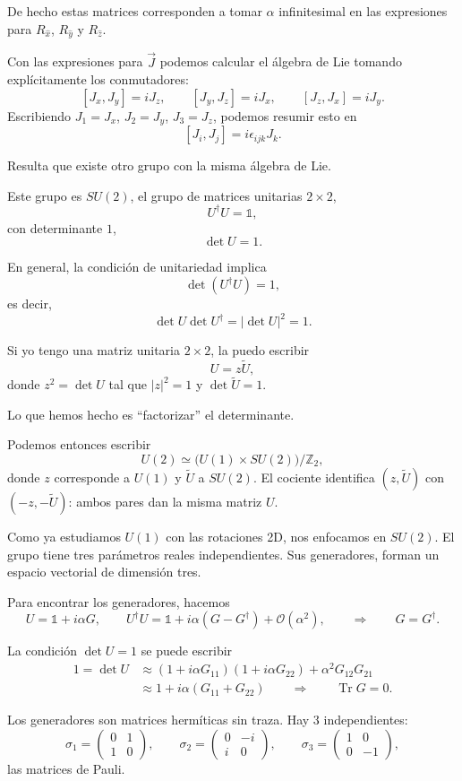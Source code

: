 \documentclass[11pt,a4paper]{article}
\newcommand{\concept}[1]{\textcolor{concept-green}{#1}}
\newcommand{\Tr}{\operatorname{Tr}}
\begin{document}
De hecho estas matrices corresponden a tomar $\alpha$ infinitesimal en las expresiones para $R_{\hat x}$, $R_{\hat y}$ y $R_{\hat z}$.

Con las expresiones para $\vec J$ podemos calcular el álgebra de Lie tomando explícitamente los conmutadores:
\[
  [J_x,J_y]=iJ_z,
  \qquad
  [J_y,J_z]=iJ_x,
  \qquad
  [J_z,J_x]=iJ_y.
\]
Escribiendo $J_1=J_x$, $J_2=J_y$, $J_3=J_z$, podemos resumir esto en
\[
  [J_i,J_j]=i\epsilon_{ijk}J_k.
\]

Resulta que existe otro grupo con la misma álgebra de Lie.

Este grupo es $SU(2)$, el grupo de matrices unitarias $2\times2$,
\[
  U^\dagger U=\mathbb 1,
\]
con determinante $1$,
\[
  \det U=1.
\]

En general, la condición de unitariedad implica
\[
  \det(U^\dagger U)=1,
\]
es decir,
\[
  \det U\det U^\dagger=|\det U|^2=1.
\]

Si yo tengo una matriz unitaria $2\times2$, la puedo escribir
\[
  U=z\widetilde U,
\]
donde $z^2=\det U$ tal que $|z|^2=1$ y $\det\widetilde U=1$.

Lo que hemos hecho es ``factorizar'' el determinante.

Podemos entonces escribir
\[
  U(2)\simeq\bigl(U(1)\times SU(2)\bigr)/\mathbb Z_2,
\]
donde $z$ corresponde a $U(1)$ y $\widetilde U$ a $SU(2)$.
El cociente identifica $(z,\widetilde U)$ con $(-z,-\widetilde U)$:
ambos pares dan la misma matriz $U$.

Como ya estudiamos $U(1)$ con las rotaciones 2D, nos enfocamos en $SU(2)$. El grupo tiene tres parámetros reales independientes. Sus generadores, forman un espacio vectorial de dimensión tres.

Para encontrar los generadores, hacemos
\[
  U=\mathbb 1+i\alpha G,
  \qquad
  U^\dagger U=\mathbb 1+i\alpha(G-G^\dagger)+\mathcal O(\alpha^2),
  \qquad\Longrightarrow\qquad
  G=G^\dagger.
\]

La condición $\det U=1$ se puede escribir
\begin{align*}
  1=\det U
  &\approx(1+i\alpha G_{11})(1+i\alpha G_{22})
    +\alpha^2G_{12}G_{21}\\
  &\approx1+i\alpha(G_{11}+G_{22})
  \qquad\Longrightarrow\qquad
  \Tr G=0.
\end{align*}

Los generadores son matrices hermíticas sin traza. Hay $3$ independientes:
\[
  \sigma_1=
  \begin{pmatrix}
    0&1\\1&0
  \end{pmatrix},
  \qquad
  \sigma_2=
  \begin{pmatrix}
    0&-i\\i&0
  \end{pmatrix},
  \qquad
  \sigma_3=
  \begin{pmatrix}
    1&0\\0&-1
  \end{pmatrix},
\]
las \concept{matrices de Pauli}.
\end{document}
